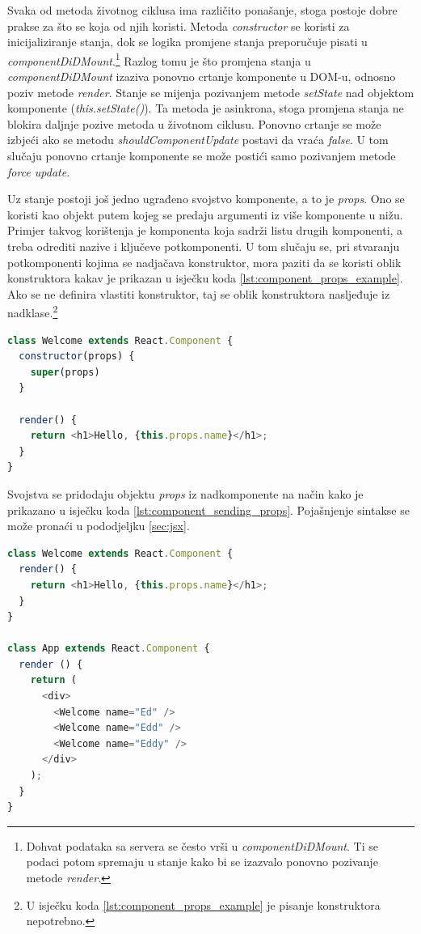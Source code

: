\documentclass[times, utf8, zavrsni, numeric]{fer}
\newcommand{\razmakp}{\vspace{18pt}}
\newcommand{\razmaks}{\vspace{10pt}}
\begin{document}
Svaka od metoda životnog ciklusa ima različito ponašanje, stoga postoje dobre prakse za što se koja od njih koristi.
Metoda \emph{constructor} se koristi za inicijaliziranje stanja, dok se logika promjene stanja preporučuje pisati u \emph{componentDiDMount}.\footnote{Dohvat podataka sa servera se često vrši u \emph{componentDiDMount}. Ti se podaci potom spremaju u stanje kako bi se izazvalo ponovno pozivanje metode \emph{render}.}
Razlog tomu je što promjena stanja u \emph{componentDiDMount} izaziva ponovno crtanje komponente u DOM-u, odnosno poziv metode \emph{render}.
Stanje se mijenja pozivanjem metode \emph{setState} nad objektom komponente (\glqq \emph{this.setState()}\grqq ).
Ta metoda je asinkrona, stoga promjena stanja ne blokira daljnje pozive metoda u životnom ciklusu.
Ponovno crtanje se može izbjeći ako se metodu \emph{shouldComponentUpdate} postavi da vraća \emph{false}.
U tom slučaju ponovno crtanje komponente se može postići samo pozivanjem metode \emph{force update}.

\razmakp
\razmakp

Uz stanje postoji još jedno ugrađeno svojstvo komponente, a to je \emph{props}.\citep{reactDocsComp&Props}
Ono se koristi kao objekt putem kojeg se predaju argumenti iz više komponente u nižu.
Primjer takvog korištenja je komponenta koja sadrži listu drugih komponenti, a treba odrediti nazive i ključeve potkomponenti.
U tom slučaju se, pri stvaranju potkomponenti kojima se nadjačava konstruktor, mora paziti da se koristi oblik konstruktora kakav je prikazan u isječku koda \ref{lst:component_props_example}.
Ako se ne definira vlastiti konstruktor, taj se oblik konstruktora nasljeđuje iz nadklase.\footnote{U isječku koda \ref{lst:component_props_example} je pisanje konstruktora nepotrebno.}

\razmakp
\begin{lstlisting}[language=JavaScript, caption={Primjer komponente s \emph{props}}, label={lst:component_props_example}]
class Welcome extends React.Component {
  constructor(props) {
    super(props)
  }

  render() {
    return <h1>Hello, {this.props.name}</h1>;
  }
}
\end{lstlisting}
\razmaks

Svojstva se pridodaju objektu \emph{props} iz nadkomponente na način kako je prikazano u isječku koda \ref{lst:component_sending_props}.
Pojašnjenje sintakse se može pronaći u pododjeljku \ref{sec:jsx}.

\razmakp
\begin{lstlisting}[language=JavaScript, caption={Primjer korištenja \emph{props}}, label={lst:component_sending_props}]
class Welcome extends React.Component {
  render() {
    return <h1>Hello, {this.props.name}</h1>;
  }
}

class App extends React.Component {
  render () {
    return (
      <div>
        <Welcome name="Ed" />
        <Welcome name="Edd" />
        <Welcome name="Eddy" />
      </div>
    );
  }
}
\end{lstlisting}
\razmaks
\end{document}
